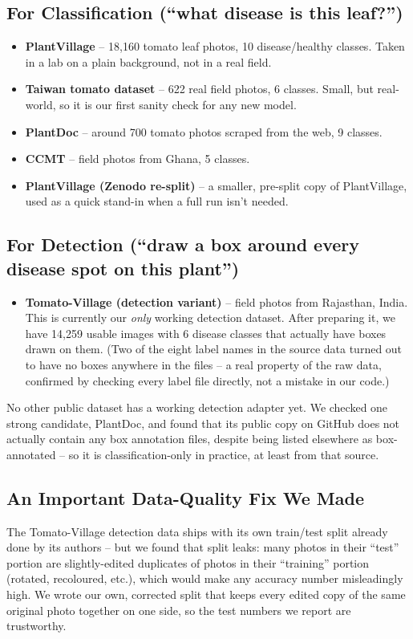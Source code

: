 \documentclass[11pt,a4paper]{article}
\begin{document}
\subsection{For Classification (``what disease is this leaf?'')}
\begin{itemize}
  \item \textbf{PlantVillage} -- 18{,}160 tomato leaf photos, 10 disease/healthy classes.
    Taken in a lab on a plain background, not in a real field.
  \item \textbf{Taiwan tomato dataset} -- 622 real field photos, 6 classes. Small, but
    real-world, so it is our first sanity check for any new model.
  \item \textbf{PlantDoc} -- around 700 tomato photos scraped from the web, 9 classes.
  \item \textbf{CCMT} -- field photos from Ghana, 5 classes.
  \item \textbf{PlantVillage (Zenodo re-split)} -- a smaller, pre-split copy of
    PlantVillage, used as a quick stand-in when a full run isn't needed.
\end{itemize}

\subsection{For Detection (``draw a box around every disease spot on this plant'')}
\begin{itemize}
  \item \textbf{Tomato-Village (detection variant)} -- field photos from Rajasthan,
    India. This is currently our \emph{only} working detection dataset. After preparing
    it, we have 14{,}259 usable images with 6 disease classes that actually have boxes
    drawn on them. (Two of the eight label names in the source data turned out to have
    no boxes anywhere in the files -- a real property of the raw data, confirmed by
    checking every label file directly, not a mistake in our code.)
\end{itemize}

\noindent No other public dataset has a working detection adapter yet. We checked one
strong candidate, PlantDoc, and found that its public copy on GitHub does not actually
contain any box annotation files, despite being listed elsewhere as box-annotated -- so
it is classification-only in practice, at least from that source.

\subsection{An Important Data-Quality Fix We Made}
The Tomato-Village detection data ships with its own train/test split already done by
its authors -- but we found that split leaks: many photos in their ``test'' portion are
slightly-edited duplicates of photos in their ``training'' portion (rotated, recoloured,
etc.), which would make any accuracy number misleadingly high. We wrote our own,
corrected split that keeps every edited copy of the same original photo together on one
side, so the test numbers we report are trustworthy.
\end{document}
